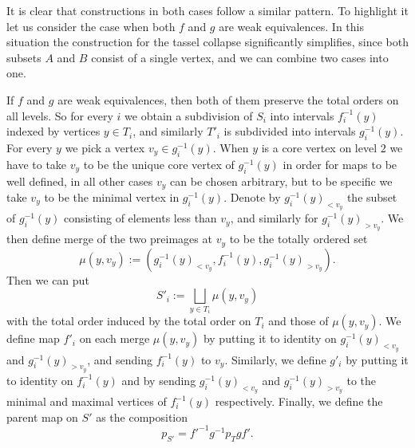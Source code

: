 \documentclass[letterpaper,12pt,leqno]{article}
\numberwithin{equation}{theorem}
\begin{document}
\begin{remark}
\label{rem_lift_w}
It is clear that constructions in both cases follow a similar pattern. To highlight it let us consider the case when both $f$ and $g$ are weak equivalences. In this situation the construction for the tassel
collapse significantly simplifies, since both subsets $A$ and $B$ consist of a single vertex, and we can combine two cases into one.

If $f$ and $g$ are weak equivalences, then both of them preserve the total orders on all levels. So for every $i$ we obtain a subdivision of $S_i$ into intervals $f_i^{-1}(y)$
indexed by vertices $y \in T_i$, and similarly $T'_i$ is subdivided into intervals $g_i^{-1}(y)$. For every $y$ we pick a vertex $v_y \in g_i^{-1}(y)$. When $y$ is a core vertex
on level $2$ we have to take $v_y$ to be the unique core vertex of $g_i^{-1}(y)$ in order for maps to be well defined, in all other cases $v_y$ can be chosen arbitrary, but
to be specific we take $v_y$ to be the minimal vertex in $g_i^{-1}(y)$. Denote by $g_i^{-1}(y)_{< v_y}$ the subset of $g_i^{-1}(y)$ consisting of elements less than $v_y$,
and similarly for $g_i^{-1}(y)_{> v_y}$. We then define merge of the two preimages at $v_y$ to be the totally ordered set
$$
\mu(y, v_y) := (g_i^{-1}(y)_{< v_y}, f_i^{-1}(y), g_i^{-1}(y)_{> v_y}).
$$
Then we can put
$$
S'_i := \bigsqcup_{y \in T_i} \mu(y, v_y)
$$
with the total order induced by the total order on $T_i$ and those of $\mu(y, v_y)$. We define map $f'_i$ on each merge $\mu(y, v_y)$ by putting it to identity on $g_i^{-1}(y)_{< v_y}$
and $g_i^{-1}(y)_{> v_y}$, and sending $f_i^{-1}(y)$ to $v_y$. Similarly, we define $g'_i$ by putting it to identity on $f_i^{-1}(y)$ and by sending $g_i^{-1}(y)_{< v_y}$
and $g_i^{-1}(y)_{> v_y}$ to the minimal and maximal vertices of $f_i^{-1}(y)$ respectively. Finally, we define the parent map on $S'$ as the composition
$$
p_{S'} = f'^{-1} g^{-1} p_T g f'.
$$
\end{remark}
\end{document}
